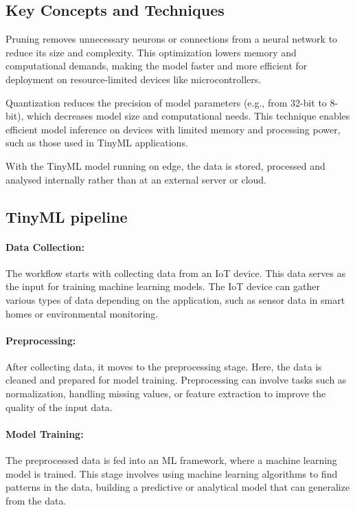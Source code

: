 \documentclass[twocolumn]{article}
\begin{document}
\subsection{Key Concepts and Techniques}

Pruning removes unnecessary neurons or connections from a neural network to reduce its size and complexity. This optimization lowers memory and computational demands, making the model faster and more efficient for deployment on resource-limited devices like microcontrollers.

Quantization reduces the precision of model parameters (e.g., from 32-bit to 8-bit), which decreases model size and computational needs. This technique enables efficient model inference on devices with limited memory and processing power, such as those used in TinyML applications.

With the TinyML model running on edge, the data is stored, processed and analysed internally rather
than at an external server or cloud. 

\subsection{TinyML pipeline}

\paragraph{Data Collection:}
	The workflow starts with collecting data from an IoT device. This data serves as the input for training machine learning models. The IoT device can gather various types of data depending on the application, such as sensor data in smart homes or environmental monitoring. \\[0.10cm]
\paragraph{Preprocessing:}
	After collecting data, it moves to the preprocessing stage. Here, the data is cleaned and prepared for model training. Preprocessing can involve tasks such as normalization, handling missing values, or feature extraction to improve the quality of the input data.\\[0.10cm]
\paragraph{Model Training:}
	The preprocessed data is fed into an ML framework, where a machine learning model is trained. This stage involves using machine learning algorithms to find patterns in the data, building a predictive or analytical model that can generalize from the data.\\[0.10cm]
\end{document}
